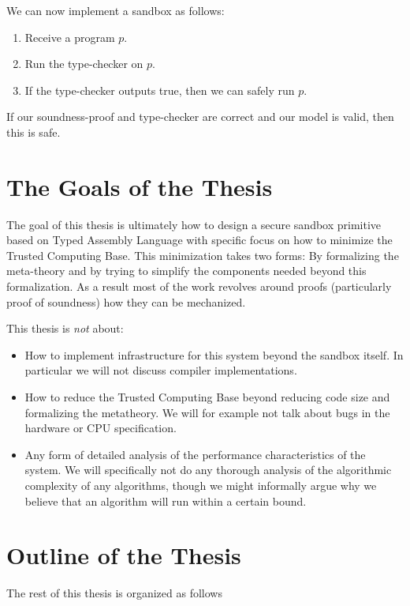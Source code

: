 We can now implement a sandbox as follows:

\begin{enumerate}
\item Receive a program $p$.
\item Run the type-checker on $p$.
\item If the type-checker outputs true, then we can safely run $p$.
\end{enumerate}

If our soundness-proof and type-checker are correct and our model is valid, then
this is safe.

\section{The Goals of the Thesis}
\label{sec:goals}

The goal of this thesis is ultimately how to design a secure sandbox primitive
based on Typed Assembly Language with specific focus on how to minimize the
Trusted Computing Base. This minimization takes two forms: By formalizing the
meta-theory and by trying to simplify the components needed beyond this
formalization. As a result most of the work revolves around proofs (particularly
proof of soundness) how they can be mechanized.

This thesis is \emph{not} about:

\begin{itemize}
\item How to implement infrastructure for this system beyond the sandbox
  itself. In particular we will not discuss compiler implementations.
\item How to reduce the Trusted Computing Base beyond reducing code size and
  formalizing the metatheory. We will for example not talk about bugs in the
  hardware or CPU specification.
\item Any form of detailed analysis of the performance characteristics of the
  system.  We will specifically not do any thorough analysis of the algorithmic
  complexity of any algorithms, though we might informally argue why we believe
  that an algorithm will run within a certain bound.
\end{itemize}

\section{Outline of the Thesis}

The rest of this thesis is organized as follows

